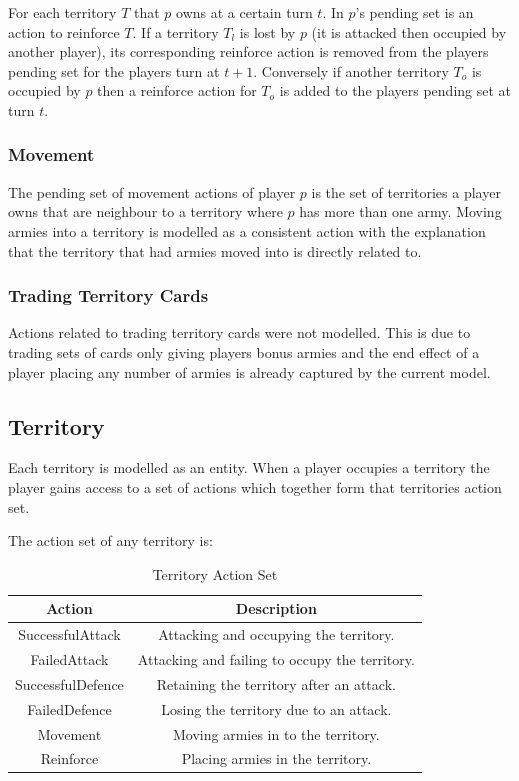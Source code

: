 \documentclass[parskip]{cs4rep}
\begin{document}
For each territory $T$ that $p$ owns at a certain turn $t$. In $p$'s pending set is an action to reinforce $T$. If a territory $T_{l}$ is lost by $p$ (it is attacked then occupied by another player), its corresponding reinforce action is removed from the players pending set for the players turn at $t+1$. Conversely if another territory $T_{o}$ is occupied by $p$ then a reinforce action for $T_{o}$ is added to the players pending set at turn $t$.

\subsubsection{Movement}

The pending set of movement actions of player $p$ is the set of territories a player owns that are neighbour to a territory where $p$ has more than one army. Moving armies into a territory is modelled as a consistent action with the explanation that the territory that had armies moved into is directly related to.

\subsubsection{Trading Territory Cards}

Actions related to trading territory cards were not modelled. This is due to trading sets of cards only giving players bonus armies and the end effect of a player placing any number of armies is already captured by the current model.

\subsection{Territory}

Each territory is modelled as an entity. When a player occupies a territory the player gains access to a set of actions which together form that territories action set.

The action set of any territory is:

\begin{table}[ht]
\centering
\begin{tabular}{|c|c|}
\hline 
\textbf{Action} & \textbf{Description} \\ 
\hline 
SuccessfulAttack & Attacking and occupying the territory.\\ 
\hline 
FailedAttack & Attacking and failing to occupy the territory.\\ 
\hline 
SuccessfulDefence & Retaining the territory after an attack.\\ 
\hline 
FailedDefence & Losing the territory due to an attack.\\
\hline
Movement & Moving armies in to the territory.\\
\hline  
Reinforce & Placing armies in the territory.\\
\hline 
\end{tabular}
\caption{Territory Action Set}
\label{table:territory-actions-bonus}
\end{table}
\end{document}

